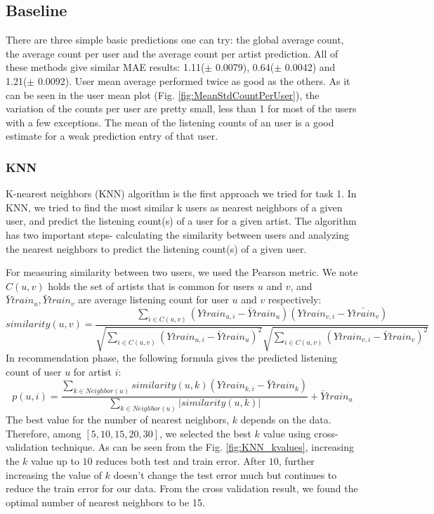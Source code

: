\subsection{Baseline}
There are three simple basic predictions one can try: the global average count, the average count per user and the average count per artist prediction. All of these methods give similar MAE results:  1.11($\pm$ 0.0079), 0.64($\pm$ 0.0042) and 1.21($\pm$ 0.0092). User mean average performed twice as good as the others. As it can be seen in the user mean plot (Fig. \ref{fig:MeanStdCountPerUser}), the
variation of the counts per user are pretty small, less than 1 for most of the users with a few exceptions. The mean of the listening counts of an user is a good estimate for a weak prediction  entry of that user.


\subsubsection{KNN}
K-nearest neighbors (KNN) algorithm is the first approach we tried for task 1. In KNN, we tried to find the most similar k users as nearest neighbors of a given user, and predict the listening count(s) of a user for a given artist. The algorithm has two important steps- calculating the similarity between users and analyzing the nearest neighbors to predict the listening count(s) of a given user. 

For measuring similarity between two users, we used the Pearson metric. We note $C(u,v)$ holds the set of artists that is common for users $u$ and $v$, and $ \bar{Y}train_u,  \bar{Y}train_v$  are average listening count for user $u$ and $v$ respectively:
\begin{equation}
  similarity(u, v)=\frac{\sum_{i\in C(u,v)} (Ytrain_{u,i} - \bar{Y}train_u)(Ytrain_{v,i} - \bar{Ytrain_v})}{\sqrt{\sum_{i\in C(u,v)} (Ytrain_{u,i} - \bar{Y}train_{u})^2} \sqrt{\sum_{i\in C(u,v)} (Ytrain_{v,i} - \bar{Y}train_{v})^2}}
\end{equation}
In recommendation phase, the following formula gives the predicted listening count of user $u$ for artist $i$:
 \begin{equation}
  p(u, i)=\frac{\sum_{k \in Neighbor(u)} similarity(u, k) (Ytrain_{k,i} - \bar{Y}train_k)}{\sum_{k \in Neighbor(u)} | similarity(u, k) |} + \bar{Y}train_u
\end{equation}
The best value for the number of nearest neighbors, $k$ depends on the data. Therefore, among $[5, 10, 15, 20, 30]$, we selected the best $k$ value using cross-validation technique. As can be seen from the Fig. \ref{fig:KNN_kvalues}, increasing the $k$ value up to $10$ reduces both test and train error. After $10$, further increasing the value of $k$ doesn't change the test error much but continues to reduce the train error for our data. From the cross validation result, we found the optimal number of nearest neighbors to be 15.

